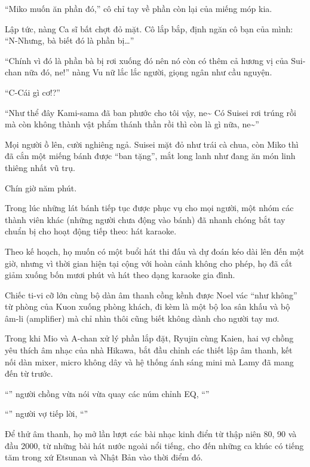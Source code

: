 \documentclass[../main.tex]{subfiles}
\begin{document}
``Miko muốn ăn phần đó,'' cô chỉ tay về phần còn lại của miếng móp kia.

Lập tức, nàng Ca sĩ bất chợt đỏ mặt. Cô lắp bắp, định ngăn cô bạn của mình: ``N-Nhưng, bà biết đó là phần bị\dots''

``Chính vì đó là phần bà bị rơi xuống đó nên nó còn có thêm cả hương vị của Sui-chan nữa đó, ne!'' nàng Vu nữ lắc lắc người, giọng ngân như cầu nguyện.

``C-Cái gì cơ!?''

``Như thể đây Kami-sama đã ban phước cho tôi vậy, ne\~{} Có Suisei rơi trúng rồi mà còn không thành vật phẩm thánh thần rồi thì còn là gì nữa, ne\~{}''

Mọi người ồ lên, cười nghiêng ngả. Suisei mặt đỏ như trái cà chua, còn Miko thì đã cắn một miếng bánh được ``ban tặng'', mắt long lanh như đang ăn món linh thiêng nhất vũ trụ.

\ct

Chín giờ năm phút.

Trong lúc những lát bánh tiếp tục được phục vụ cho mọi người, một nhóm các thành viên khác (những người chưa động vào bánh) đã nhanh chóng bắt tay chuẩn bị cho hoạt động tiếp theo: hát karaoke.

Theo kế hoạch, họ muốn có một buổi hát thi đấu và dự đoán kéo dài lên đến một giờ, nhưng vì thời gian hiện tại cộng với hoàn cảnh không cho phép, họ đã cắt giảm xuống bốn mươi phút và hát theo dạng karaoke gia đình.

Chiếc ti-vi cỡ lớn cùng bộ dàn âm thanh cồng kềnh được Noel vác ``như không'' từ phòng của Kuon xuống phòng khách, đi kèm là một bộ loa sân khấu và bộ âm-li (amplifier) mà chỉ nhìn thôi cũng biết không dành cho người tay mơ.

Trong khi Mio và A-chan xử lý phần lắp đặt, Ryujin cùng Kaien, hai vợ chồng yêu thích âm nhạc của nhà Hikawa, bắt đầu chỉnh các thiết lập âm thanh, kết nối dàn mixer, micro không dây và hệ thống ánh sáng mini mà Lamy đã mang đến từ trước.

``'' người chồng vừa nói vừa quay các núm chỉnh EQ, ``''

``'' người vợ tiếp lời, ``''

Để thử âm thanh, họ mở lần lượt các bài nhạc kinh điển từ thập niên 80, 90 và đầu 2000, từ những bài hát nước ngoài nổi tiếng, cho đến những ca khúc có tiếng tăm trong xứ Etsunan và Nhật Bản vào thời điểm đó.
\end{document}
